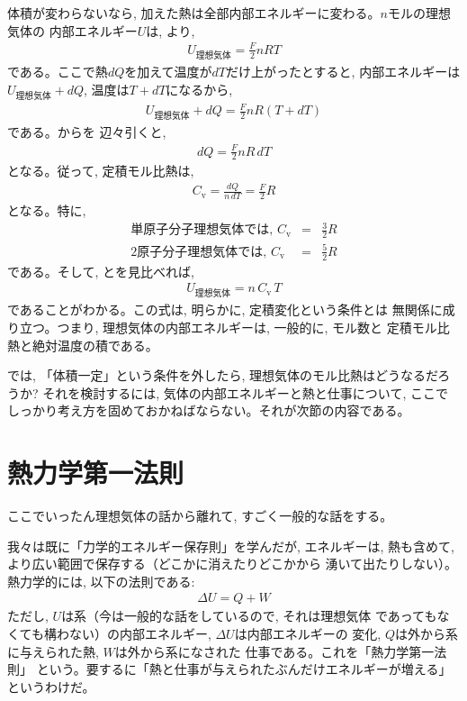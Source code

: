 体積が変わらないなら, 加えた熱は全部内部エネルギーに変わる。$n$モルの理想気体の
内部エネルギー$U$は, より, 
\begin{eqnarray}
U_{\text{理想気体}}=\frac{F}{2}nRT\label{eq:specific_heat_vconst2}
\end{eqnarray}
である。ここで熱$dQ$を加えて温度が$dT$だけ上がったとすると, 内部エネルギーは
$U_{\text{理想気体}}+dQ$, 温度は$T+dT$になるから, 
\begin{eqnarray}
U_{\text{理想気体}}+dQ=\frac{F}{2}nR(T+dT)\label{eq:specific_heat_vconst4}
\end{eqnarray}
である。からを
辺々引くと, 
\begin{eqnarray}
dQ=\frac{F}{2}nR\,dT\label{eq:specific_heat_vconst6}
\end{eqnarray}
となる。従って, 定積モル比熱は, 
\begin{eqnarray}
C_{\text{v}}=\frac{dQ}{n\,dT}=\frac{F}{2}R\label{eq:gas_specificheat}
\end{eqnarray}
となる。特に, 
\begin{eqnarray}
\text{単原子分子理想気体では, }C_{\text{v}}&=&\frac{3}{2}R\label{eq:Cv_monomol}\\
\text{2原子分子理想気体では, }C_{\text{v}}&=&\frac{5}{2}R\label{eq:Cv_2mol}
\end{eqnarray}
である。そして, とを見比べれば, 
\begin{eqnarray}
U_{\text{理想気体}}=n\,C_{\text{v}}\,T\label{eq:U_nCvT}
\end{eqnarray}
であることがわかる。この式は, 明らかに, 定積変化という条件とは
無関係に成り立つ。つまり, 理想気体の内部エネルギーは, 一般的に, モル数と
定積モル比熱と絶対温度の積である。

では, 「体積一定」という条件を外したら, 理想気体のモル比熱はどうなるだろうか?
それを検討するには, 気体の内部エネルギーと熱と仕事について, ここで
しっかり考え方を固めておかねばならない。それが次節の内容である。\\


\section{熱力学第一法則}

ここでいったん理想気体の話から離れて, すごく一般的な話をする。

我々は既に「力学的エネルギー保存則」を学んだが, エネルギーは, 
熱も含めて, より広い範囲で保存する（どこかに消えたりどこかから
湧いて出たりしない）。熱力学的には, 以下の法則である:
\begin{eqnarray}
\Delta U=Q+W\label{eq:thermlaw1}
\end{eqnarray}
ただし, $U$は系（今は一般的な話をしているので, それは理想気体
であってもなくても構わない）の内部エネルギー, $\Delta U$は内部エネルギーの
変化, $Q$は外から系に与えられた熱, $W$は外から系になされた
仕事である。これを「熱力学第一法則」
という。要するに「熱と仕事が与えられたぶんだけエネルギーが増える」
というわけだ。

